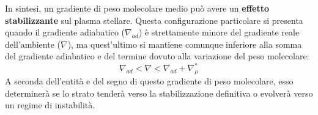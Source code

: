 In sintesi, un gradiente di peso molecolare medio può avere un \textbf{effetto stabilizzante} sul plasma stellare. Questa configurazione particolare si presenta quando il gradiente adiabatico ($\nabla_{ad}$) è strettamente minore del gradiente reale dell'ambiente ($\nabla$), ma quest'ultimo si mantiene comunque inferiore alla somma del gradiente adiabatico e del termine dovuto alla variazione del peso molecolare:
\begin{equation}
\nabla_{ad} < \nabla < \nabla_{ad} + \nabla_\mu^*
\end{equation}
A seconda dell'entità e del segno di questo gradiente di peso molecolare, esso determinerà se lo strato tenderà verso la stabilizzazione definitiva o evolverà verso un regime di instabilità.